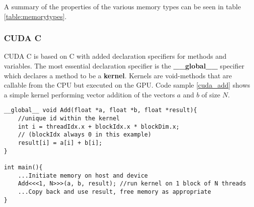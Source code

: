 A summary of the properties of the various memory types can be seen in table \ref{table:memorytypes}.

\begin{table}[h!]
\centering
{}
\caption{Properties of CUDA memory types\label{table:memorytypes}}
\end{table}

\subsubsection{CUDA C}
CUDA C is based on C with added declaration specifiers for methods and variables. 
The most essential declaration specifier is the \textbf{\_\_global\_\_} specifier which declares a method to be a \textbf{kernel}. 
Kernels are void-methods that are callable from the CPU but executed on the GPU. 
Code sample \ref{cuda_add} shows a simple kernel performing vector addition of the vectors $a$ and $b$ of size $N$.

\begin{lstlisting}[language=cudac, caption=CUDA C addition kernel, label=cuda_add]
__global__ void Add(float *a, float *b, float *result){
	//unique id within the kernel
	int i = threadIdx.x + blockIdx.x * blockDim.x;
	// (blockIdx always 0 in this example)
	result[i] = a[i] + b[i];
}

int main(){
	...Initiate memory on host and device
	Add<<<1, N>>>(a, b, result); //run kernel on 1 block of N threads
	...Copy back and use result, free memory as appropriate
}
\end{lstlisting}

